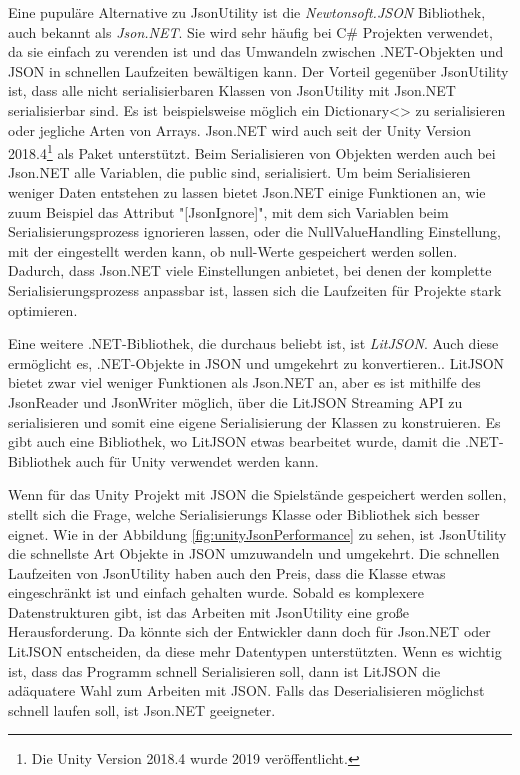 Eine pupuläre Alternative zu JsonUtility ist die \textit{Newtonsoft.JSON} Bibliothek, auch bekannt als \textit{Json.NET}. Sie wird sehr häufig bei C\# Projekten verwendet, da sie einfach zu verenden ist und das Umwandeln zwischen .NET-Objekten und JSON in schnellen Laufzeiten bewältigen kann.\cite{newtonsoftJsonNETNewtonsoft} Der Vorteil gegenüber JsonUtility ist, dass alle nicht serialisierbaren Klassen von JsonUtility mit Json.NET serialisierbar sind. Es ist beispielsweise möglich ein Dictionary<> zu serialisieren\cite{newtonsoftSerializeDictionary}\cite{newtonsoftDeserializeDictionary} oder jegliche Arten von Arrays. Json.NET wird auch seit der Unity Version 2018.4\footnote{Die Unity Version 2018.4 wurde 2019 veröffentlicht.\cite{unityDownloadArchive}} als Paket  unterstützt.\cite{NewtonsoftJsonUnitySupport} Beim Serialisieren von Objekten werden auch bei Json.NET alle Variablen, die public sind, serialisiert. Um beim Serialisieren weniger Daten entstehen zu lassen bietet Json.NET einige Funktionen an, wie zuum Beispiel das Attribut "[JsonIgnore]", mit dem sich Variablen beim Serialisierungsprozess ignorieren lassen, oder die NullValueHandling Einstellung, mit der eingestellt werden kann, ob null-Werte gespeichert werden sollen. Dadurch, dass Json.NET viele Einstellungen anbietet, bei denen der komplette Serialisierungsprozess anpassbar ist, lassen sich die Laufzeiten für Projekte stark optimieren.\cite{newtonsoftReducingSerialized}\cite{newtonsoftPerformanceTips}

Eine weitere .NET-Bibliothek, die durchaus beliebt ist, ist \textit{LitJSON}. Auch diese ermöglicht es, .NET-Objekte in JSON und umgekehrt zu konvertieren.\cite{litjsonLitJSONDocumentation}. LitJSON bietet zwar viel weniger Funktionen als Json.NET an, aber es ist mithilfe des JsonReader und JsonWriter möglich, über die LitJSON Streaming API zu serialisieren und somit eine eigene Serialisierung der Klassen zu konstruieren.\cite{litjsonLitJSONReaders} Es gibt auch eine Bibliothek, wo LitJSON etwas bearbeitet wurde, damit die .NET-Bibliothek auch für Unity verwendet werden kann.\cite{githubGitHubMervillUnityLitJson}

Wenn für das Unity Projekt mit JSON die Spielstände gespeichert werden sollen, stellt sich die Frage, welche Serialisierungs Klasse oder Bibliothek sich besser eignet. Wie in der Abbildung \ref{fig:unityJsonPerformance} zu sehen, ist JsonUtility die schnellste Art Objekte in JSON umzuwandeln und umgekehrt. Die schnellen Laufzeiten von JsonUtility haben auch den Preis, dass die Klasse etwas eingeschränkt ist und einfach gehalten wurde. Sobald es komplexere Datenstrukturen gibt, ist das Arbeiten mit JsonUtility eine große Herausforderung. Da könnte sich der Entwickler dann doch für Json.NET oder LitJSON entscheiden, da diese mehr Datentypen unterstützten. Wenn es wichtig ist, dass das Programm schnell Serialisieren soll, dann ist LitJSON die adäquatere Wahl zum Arbeiten mit JSON. Falls das Deserialisieren möglichst schnell laufen soll, ist Json.NET geeigneter.


